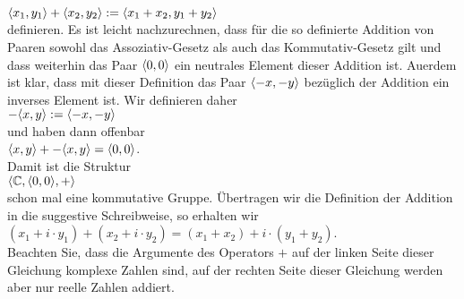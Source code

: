 $\pair(x_1,y_1) + \pair(x_2, y_2) := \pair(x_1 + x_2, y_1 + y_2)$
\\[0.2cm]
definieren.  Es ist leicht nachzurechnen, dass f\"{u}r die so definierte Addition von Paaren
sowohl das Assoziativ-Gesetz als auch das Kommutativ-Gesetz gilt und dass weiterhin das
Paar $\pair(0,0)$ ein neutrales Element 
dieser Addition ist.  Au\3erdem ist klar, dass mit dieser Definition das Paar
$\pair(-x,-y)$ bez\"{u}glich der Addition ein inverses Element ist.  Wir definieren daher
\\[0.2cm]
\hspace*{1.3cm}
$-\pair(x,y) := \pair(-x,-y)$
\\[0.2cm]
und haben dann offenbar
\\[0.2cm]
\hspace*{1.3cm}
$\pair(x, y) + -\pair(x,y) = \pair(0,0)$.
\\[0.2cm]
Damit ist die Struktur
\\[0.2cm]
\hspace*{1.3cm}
$\langle \mathbb{C}, \pair(0,0), + \rangle$
\\[0.2cm]
schon mal eine kommutative Gruppe.
\"{U}bertragen wir die Definition der Addition in die suggestive Schreibweise, so erhalten wir
\\[0.2cm]
\hspace*{1.3cm}
$(x_1 + i \cdot y_1) + (x_2 + i \cdot y_2) = (x_1 + x_2) + i \cdot (y_1 + y_2)$.
\\[0.2cm]
Beachten Sie, dass die Argumente des Operators $+$ auf der linken Seite dieser Gleichung
komplexe Zahlen sind, auf der rechten Seite dieser Gleichung werden aber nur reelle Zahlen
addiert.  

